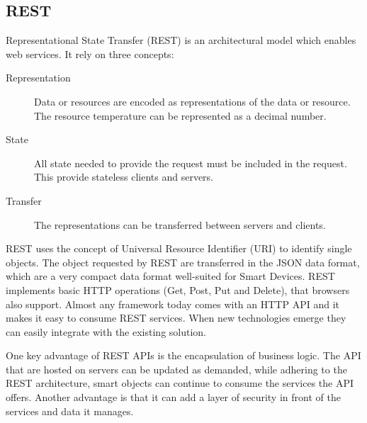 \subsection{REST}
Representational State Transfer (REST) is an architectural model which enables web services. It rely on three concepts: 
\begin{description}
    \item[Representation] Data or resources are encoded as representations of the data or resource. The resource temperature can be represented as a decimal number.
    \item[State] All state needed to provide the request must be included in the request. This provide stateless clients and servers. 
    \item[Transfer] The representations can be transferred between servers and clients.
\end{description} \cite{smartthings}

REST uses the concept of Universal Resource Identifier (URI) to identify single objects. The object requested by REST are transferred in the JSON data format, which are a very compact data format well-suited for Smart Devices. REST implements basic HTTP operations (Get, Post, Put and Delete), that browsers also support. Almost any framework today comes with an HTTP API and it makes it easy to consume REST services. When new technologies emerge they can easily integrate with the existing solution.  

One key advantage of REST APIs is the encapsulation of business logic. The API that are hosted on servers can be updated as demanded, while adhering to the REST architecture, smart objects can continue to consume the services the API offers. Another advantage is that it can add a layer of security in front of the services and data it manages.